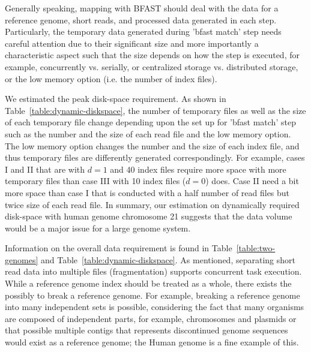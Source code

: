 \documentclass{cpeauth}
\begin{document}

Generally speaking, mapping with BFAST should deal with the data for a
reference genome, short reads, and processed data generated in each
step.  Particularly, the temporary data generated during 'bfast match'
step needs careful attention due to their significant size and more
importantly a characteristic aspect such that the size depends on how
the step is executed, for example, concurrently vs. serially, or
centralized storage vs. distributed storage, or the low memory option
(i.e. the number of index files).

We estimated the peak disk-space requirement.  As shown
in Table~\ref{table:dynamic-diskspace}, the number of temporary files as
well as the size of each temporary file change depending upon the set
up for 'bfast match' step such as the number and the size of each read
file and the low memory option.  The low memory option changes the number and the size
of each index file, and thus temporary files are differently generated correspondingly.  For example, cases I and II that
are with $d=1$ and 40 index files require more space with more
temporary files than case III with 10 index files ($d=0$) does. Case
II need a bit more space than case I that is conducted with a half
number of read files but twice size of each read file.  In summary, our estimation on dynamically required disk-space with human
genome chromosome 21 suggests that the data volume would be a major
issue for a large genome system.
   


Information on the overall data requirement is found in
Table~\ref{table:two-genomes} and
Table~\ref{table:dynamic-diskspace}. As mentioned, separating short
read data into multiple files (fragmentation) supports concurrent task
execution.  While a reference genome index should be treated as a
whole, there exists the possibly to break a reference genome.  For
example, breaking a reference genome into many independent sets is
possible, considering the fact that many organisms are composed of
independent parts, for example, chromosomes and plasmids or that
possible multiple contigs that represents discontinued genome
sequences would exist as a reference genome; the Human genome is a
fine example of this.
\end{document}
